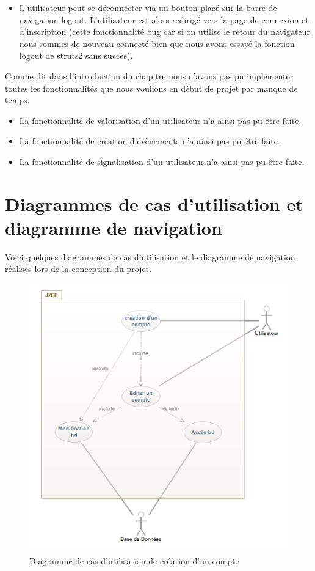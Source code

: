 \begin{itemize}
 \item L'utilisateur peut se déconnecter via un bouton placé sur la barre de navigation logout.
  L'utilisateur est alors redirigé vers la page de connexion et d'inscription (cette fonctionnalité bug car si on utilise le retour du navigateur nous sommes de nouveau connecté bien que nous avons essayé la fonction logout de struts2 sans succès).
\end{itemize}

Comme dit dans l'introduction du chapitre nous n'avons pas pu implémenter toutes les fonctionnalités que nous voulions en début de projet par manque de temps.
\begin{itemize}
\item La fonctionnalité de valorisation d'un utilisateur n'a ainsi pas pu être faite.
\item La fonctionnalité de création d'évènements n'a ainsi pas pu être faite.
\item La fonctionnalité de signalisation d'un utilisateur n'a ainsi pas pu être faite.

\end{itemize}

\newpage
\section{Diagrammes de cas d'utilisation et diagramme de navigation}

Voici quelques diagrammes de cas d'utilisation et le diagramme de navigation réalisés lors de la conception du projet.
\vfill
\begin{figure}[ht!]
  \centering
   \caption{Diagramme de cas d'utilisation de création d'un compte}
   \includegraphics[scale=0.7]{cuCC}
\end{figure}

